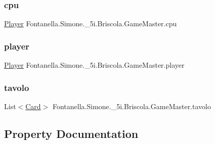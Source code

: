 \subsubsection{\texorpdfstring{cpu}{cpu}}
{\footnotesize\ttfamily \hyperlink{class_fontanella_1_1_simone_1_1__5i_1_1_briscola_1_1_player}{Player} Fontanella.\+Simone.\+\_\+5i.\+Briscola.\+Game\+Master.\+cpu}

\hypertarget{class_fontanella_1_1_simone_1_1__5i_1_1_briscola_1_1_game_master_ad26dcfbe972933f69347ff5219b9c668}{}\label{class_fontanella_1_1_simone_1_1__5i_1_1_briscola_1_1_game_master_ad26dcfbe972933f69347ff5219b9c668} 
\subsubsection{\texorpdfstring{player}{player}}
{\footnotesize\ttfamily \hyperlink{class_fontanella_1_1_simone_1_1__5i_1_1_briscola_1_1_player}{Player} Fontanella.\+Simone.\+\_\+5i.\+Briscola.\+Game\+Master.\+player}

\hypertarget{class_fontanella_1_1_simone_1_1__5i_1_1_briscola_1_1_game_master_adcaefbbcbe19d0539c429d66c5c8f431}{}\label{class_fontanella_1_1_simone_1_1__5i_1_1_briscola_1_1_game_master_adcaefbbcbe19d0539c429d66c5c8f431} 
\subsubsection{\texorpdfstring{tavolo}{tavolo}}
{\footnotesize\ttfamily List$<$\hyperlink{class_fontanella_1_1_simone_1_1__5i_1_1_briscola_1_1_card}{Card}$>$ Fontanella.\+Simone.\+\_\+5i.\+Briscola.\+Game\+Master.\+tavolo}



\subsection{Property Documentation}
\hypertarget{class_fontanella_1_1_simone_1_1__5i_1_1_briscola_1_1_game_master_a20b2b972a62fd9a96cc40c1540732550}{}\label{class_fontanella_1_1_simone_1_1__5i_1_1_briscola_1_1_game_master_a20b2b972a62fd9a96cc40c1540732550} 
